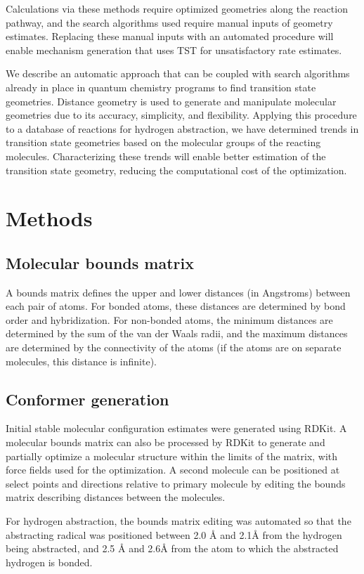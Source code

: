 \documentclass[11pt]{article}
\begin{document}
Calculations via these methods require optimized geometries along the reaction pathway, and the search algorithms used require manual inputs of geometry estimates. Replacing these manual inputs with an automated procedure will enable mechanism generation that uses TST for unsatisfactory rate estimates.

We describe an automatic approach that can be coupled with search algorithms already in place in quantum chemistry programs to find transition state geometries. Distance geometry is used to generate and manipulate molecular geometries due to its accuracy, simplicity, and flexibility. Applying this procedure to a database of reactions for hydrogen abstraction, we have determined trends in transition state geometries based on the molecular groups of the reacting molecules. Characterizing these trends will enable better estimation of the transition state geometry, reducing the computational cost of the optimization.

\section{Methods}
\subsection{Molecular bounds matrix}
A bounds matrix defines the upper and lower distances (in Angstroms) between each pair of atoms. For bonded atoms, these distances are determined by bond order and hybridization. For non-bonded atoms, the minimum distances are determined by the sum of the van der Waals radii, and the maximum distances are determined by the connectivity of the atoms (if the atoms are on separate molecules, this distance is infinite).

\subsection{Conformer generation}
Initial stable molecular configuration estimates were generated using RDKit. A molecular bounds matrix can also be processed by RDKit to generate and partially optimize a molecular structure within the limits of the matrix, with force fields used for the optimization. A second molecule can be positioned at select points and directions relative to primary molecule by editing the bounds matrix describing distances between the molecules.

For hydrogen abstraction, the bounds matrix editing was automated so that the abstracting radical was positioned between 2.0 {\AA} and 2.1{\AA} from the hydrogen being abstracted, and 2.5 {\AA} and 2.6{\AA} from the atom to which the abstracted hydrogen is bonded.
\end{document}
